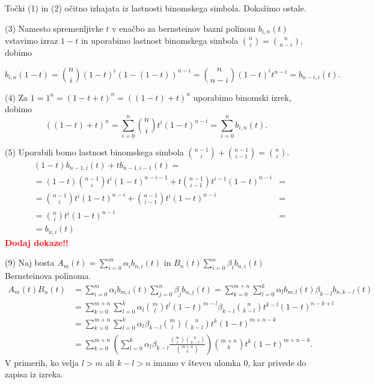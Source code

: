 \documentclass[isrm2, tisk]{fmfdelo}
\newcommand{\bernstein}[2]{\binom{#1}{#2}t^{#2}(1-t)^{#1-#2}}
\newcommand{\lilb}[2]{b_{#1,#2}(t)}
\newcommand{\mycomment}[1]{\textbf{\textcolor{red}{#1}}}
\begin{document}
    \begin{dokaz}
        Točki (1) in (2) očitno izhajata iz lastnosti binomskega simbola.
        Dokažimo ostale.

        \noindent(3) Namesto spremenljivke $t$ v enačbo za bernsteinov bazni polinom $\lilb{i}{n}$ vstavimo izraz $1-t$ in uporabimo lastnost binomskega simbola $\binom{n}{i} = \binom{n}{n-i}$, dobimo

        \[b_{i,n}(1-t) = \binom{n}{i}(1-t)^i(1-(1-t))^{n-i} =  \binom{n}{n-i}(1-t)^it^{n-i} = b_{n-i,i}(t).\]

        \noindent(4) Za $1 = 1^n = (1-t+t)^n = ((1-t) + t)^n$ uporabimo binomski izrek, dobimo
        \[\left((1-t) + t\right)^n = \sum_{i=0}^{n}\bernstein{n}{i} = \sum_{i=0}^n \lilb{i}{n}.\]

        \noindent(5) Uporabili bomo lastnost binomskega simbola $ \binom{n-1}{i} + \binom{n-1}{i-1} = \binom{n}{i}.$
        \begin{align}
            &(1-t)\lilb{n-1}{i} + t\lilb{n-1}{i-1} = \nonumber \\
            &= (1-t)\binom{n-1}{i}t^{i}(1-t)^{n-i-1} + t\binom{n-1}{i-1}t^{i-1}(1-t)^{n-i} &= \nonumber \\
            &= \binom{n-1}{i}t^{i}(1-t)^{n-i} + \binom{n-1}{i-1}t^{i}(1-t)^{n-i} &= \nonumber \\
            &= \binom{n}{i}t^{i}(1-t)^{n-i} &= \nonumber \\
            &= \lilb{n}{i}
        \end{align}
        \noindent \mycomment{Dodaj dokaze!!}

        \noindent(9) Naj bosta $A_m(t)=\sum_{i=0}^{m}\alpha_i\lilb{n}{i}$ in $B_n(t)\sum_{i=0}^{n}\beta_i\lilb{n}{i}$ Bernsteinova polinoma.
        \begin{align*}
            A_m(t)B_n(t) &=\sum_{i=0}^{m}\alpha_i\lilb{m}{i}\sum_{j=0}^{n}\beta_j\lilb{n}{j} = \sum_{k=0}^{m+n}\sum_{l=0}^k \alpha_l\lilb{m}{l}\beta_{k-l}\lilb{n}{k-l} \\
            &= \sum_{k=0}^{m+n}\sum_{l=0}^k \alpha_l \binom{m}{l}t^{l}(1-t)^{m-l} \beta_{k-l} \binom{n}{k-l}t^{k-l}(1-t)^{n-k+l} \\
            &= \sum_{k=0}^{m+n}\sum_{l=0}^k \alpha_l \beta_{k-l} \binom{m}{l}\binom{n}{k-l}t^{k}(1-t)^{m+n-k} \\
            &= \sum_{k=0}^{m+n} \left(\sum_{l=0}^k  \alpha_l \beta_{k-l}\frac{\binom{m}{l}\binom{n}{k-l}}{\binom{m+n}{k}}\right) \binom{m+n}{k} t^{k}(1-t)^{m+n-k}.
        \end{align*}
        V primerih, ko velja $l>m$ ali $k-l>n$ imamo v števcu ulomka $0$, kar privede do zapisa iz izreka.
    \end{dokaz}
\end{document}

